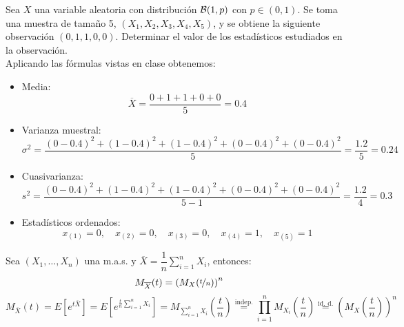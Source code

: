 \begin{ejemplo}
    Sea $X$ una variable aleatoria con distribución $\mathcal{B}(1,p)$ con $p\in (0,1)$. Se toma una muestra de tamaño 5, $(X_1, X_2, X_3, X_4, X_5)$, y se obtiene la siguiente observación $(0,1,1,0,0)$. Determinar el valor de los estadísticos estudiados en la observación.\\

    \noindent
    Aplicando las fórmulas vistas en clase obtenemos:
    \begin{itemize}
        \item Media:
        \begin{equation*}
            \overline{X} = \dfrac{0+1+1+0+0}{5} = 0.4
        \end{equation*}
        \item Varianza muestral:
        \begin{equation*}
            \sigma^2 = \dfrac{(0-0.4)^2 + (1-0.4)^2 + (1-0.4)^2 + (0-0.4)^2 + (0-0.4)^2}{5} = \dfrac{1.2}{5} = 0.24
        \end{equation*}
        \item Cuasivarianza:
        \begin{equation*}
            s^2 = \dfrac{(0-0.4)^2 + (1-0.4)^2 + (1-0.4)^2 + (0-0.4)^2 + (0-0.4)^2}{5-1} =
            \dfrac{1.2}{4} = 0.3
        \end{equation*}
        \item Estadísticos ordenados:
        \begin{equation*}
            x_{(1)} = 0, \quad x_{(2)} = 0, \quad x_{(3)} = 0, \quad x_{(4)} = 1, \quad x_{(5)} = 1
        \end{equation*}
    \end{itemize}
\end{ejemplo}

\begin{ejemplo}
    Sea $(X_1, \ldots, X_n)$ una m.a.s. y $\overline{X} = \dfrac{1}{n}\sum\limits_{i=1}^{n}X_i$, entonces:
    \begin{equation*}
        M_{\overline{X}}(t) = {(M_X(\nicefrac{t}{n}))}^{n}
    \end{equation*}
    \begin{equation*}
        M_{\overline{X}}(t) = E\left[e^{t\overline{X}}\right] = E\left[e^{\frac{t}{n}\sum\limits_{i=1}^{n}X_i}\right] = M_{\sum\limits_{i=1}^{n}X_i}\left(\frac{t}{n}\right) \stackrel{\text{indep.}}{=} \prod_{i=1}^{n} M_{X_i}\left(\frac{t}{n}\right) \stackrel{\text{id. d.}}{=} {\left(M_X\left(\frac{t}{n}\right)\right)}^{n}
    \end{equation*}
\end{ejemplo}

